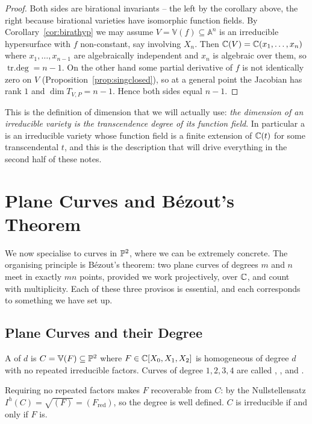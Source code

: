 \documentclass[a4paper]{scrartcl}
\newcommand{\A}{\mathbb{A}}
\newcommand{\V}{\mathbb{V}}
\DeclareMathOperator{\trdeg}{tr.deg}
\begin{document}
\begin{proof}
	Both sides are birational invariants -- the left by the corollary above, the right because birational varieties have isomorphic function fields. By Corollary~\ref{cor:birathyp} we may assume $V = \V(f) \subseteq \A^{n}$ is an irreducible hypersurface with $f$ non-constant, say involving $X_n$. Then $\mathbb{C}(V) = \mathbb{C}(x_1,\dots,x_n)$ where $x_1,\dots,x_{n-1}$ are algebraically independent and $x_n$ is algebraic over them, so $\trdeg = n-1$. On the other hand some partial derivative of $f$ is not identically zero on $V$ (Proposition~\ref{prop:singclosed}), so at a general point the Jacobian has rank $1$ and $\dim T_{V,P} = n-1$. Hence both sides equal $n-1$.
\end{proof}

This is the definition of dimension that we will actually use: \emph{the dimension of an irreducible variety is the transcendence degree of its function field}. In particular a  is an irreducible variety whose function field is a finite extension of $\mathbb{C}(t)$ for some transcendental $t$, and this is the description that will drive everything in the second half of these notes.

\section{Plane Curves and B\'ezout's Theorem}

We now specialise to curves in $\mathbb{P}^2$, where we can be extremely concrete. The organising principle is B\'ezout's theorem: two plane curves of degrees $m$ and $n$ meet in exactly $mn$ points, provided we work projectively, over $\mathbb{C}$, and count with multiplicity. Each of these three provisos is essential, and each corresponds to something we have set up.

\subsection{Plane Curves and their Degree}

\begin{definition}
	A  of  $d$ is $C = \V(F) \subseteq \PP^2$ where $F \in \mathbb{C}[X_0,X_1,X_2]$ is homogeneous of degree $d$ with no repeated irreducible factors. Curves of degree $1,2,3,4$ are called , ,  and .
\end{definition}

Requiring no repeated factors makes $F$ recoverable from $C$: by the Nullstellensatz $I^h(C) = \sqrt{(F)} = (F_{\mathrm{red}})$, so the degree is well defined. $C$ is irreducible if and only if $F$ is.
\end{document}
